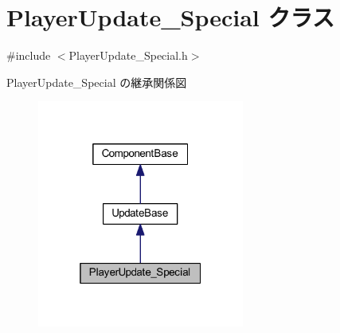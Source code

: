 \hypertarget{class_player_update___special}{}\section{Player\+Update\+\_\+\+Special クラス}
\label{class_player_update___special}


{\ttfamily \#include $<$Player\+Update\+\_\+\+Special.\+h$>$}



Player\+Update\+\_\+\+Special の継承関係図\nopagebreak
\begin{figure}[H]
\begin{center}
\leavevmode
\includegraphics[width=193pt]{class_player_update___special__inherit__graph}
\end{center}
\end{figure}
